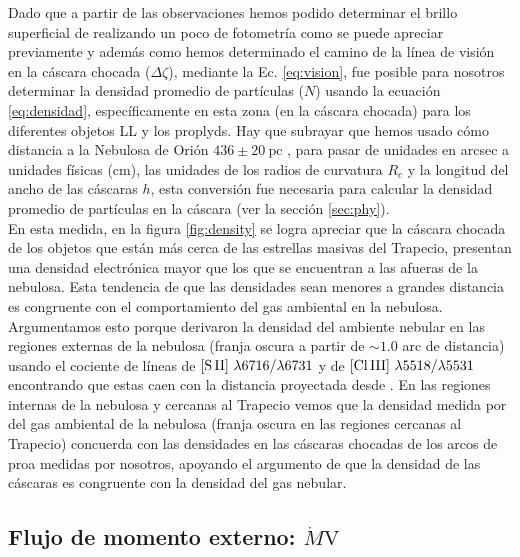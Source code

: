 Dado que a partir de las observaciones hemos podido determinar el brillo superficial de \ha{} realizando un poco de fotometría como se puede apreciar previamente y además como hemos determinado el camino de la línea de visión en la cáscara chocada (\(\Delta\zeta\)), mediante la Ec. \ref{eq:vision}, fue posible para nosotros determinar la densidad promedio de partículas (\(N\)) usando la ecuación \ref{eq:densidad}, específicamente en esta zona (en la cáscara chocada) para los diferentes objetos LL y los proplyds. Hay que subrayar que hemos usado cómo distancia a la Nebulosa de Orión \(436 \pm 20~\text{pc}\) \citep{Odell:2008}, para pasar  de unidades en arcsec a unidades físicas (cm), las unidades de los radios de curvatura \(R_{c}\) y la longitud del ancho de las cáscaras \(h\), esta conversión fue necesaria para calcular la densidad promedio de partículas en la cáscara (ver la sección \ref{sec:phy}).\\

En esta medida, en la figura \ref{fig:density} se logra apreciar que la cáscara chocada de los objetos que están más cerca de las estrellas masivas del Trapecio, presentan una densidad electrónica mayor que los que se encuentran a las afueras de la nebulosa. Esta tendencia de que las densidades sean menores a grandes distancia es congruente con el comportamiento del gas ambiental en la nebulosa. Argumentamos esto porque \citet{Odell:2010} derivaron la densidad del ambiente nebular en las regiones externas de la nebulosa (franja oscura a partir de \(\sim 1.0\) arc de distancia) usando el cociente de líneas de \(\mathrm{[S\,II]}~\lambda 6716/\lambda 6731\) y de \(\mathrm{[Cl\,III]}~\lambda 5518/\lambda 5531\) encontrando que estas caen con la distancia proyectada desde \thC{}. En las regiones internas de la nebulosa y cercanas al Trapecio vemos que la densidad medida por \citet{Mesa:2008} del gas ambiental de la nebulosa (franja oscura en las regiones cercanas  al Trapecio) concuerda con las densidades en las cáscaras chocadas de los arcos de proa medidas por nosotros, apoyando el argumento de que la densidad de las cáscaras es congruente con la densidad del gas nebular.    

\subsection{Flujo de momento externo: \(\dot{M}\text{V}\) }
\label{sec:pressure}

